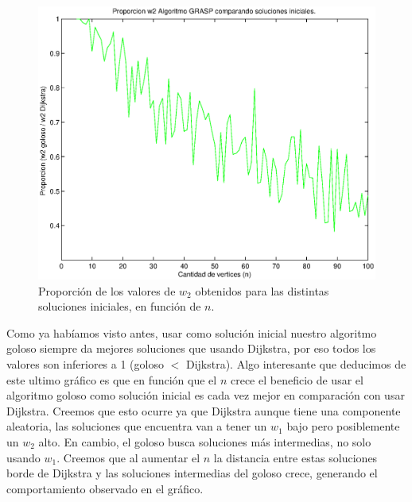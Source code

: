 \begin{figure}[H]
  \begin{center}
    \begin{minipage}{0.7\linewidth}
      \includegraphics[width=\linewidth]{graficos/grasp_comparacion_soluciones_iniciales_tiempo.eps}
      \caption{Proporción de los valores de $w_2$ obtenidos para las distintas soluciones iniciales, en función de $n$.}\label{fig:grasp-soluciones-iniciales-tiempo}
    \end{minipage}
  \end{center}
\end{figure}


Como ya habíamos visto antes, usar como solución inicial nuestro algoritmo goloso siempre da mejores soluciones que usando Dijkstra, por eso todos los valores son inferiores a 1 (goloso $<$ Dijkstra). Algo interesante que deducimos de este ultimo gráfico es que en función que el $n$ crece el beneficio de usar el algoritmo goloso como solución inicial es cada vez mejor en comparación con usar Dijkstra. Creemos que esto ocurre ya que Dijkstra aunque tiene una componente aleatoria, las soluciones que encuentra van a tener un $w_1$ bajo pero posiblemente un $w_2$ alto. En cambio, el goloso busca soluciones más intermedias, no solo usando $w_1$. Creemos que al aumentar el $n$ la distancia entre estas soluciones borde de Dijkstra y las soluciones intermedias del goloso crece, generando el comportamiento observado en el gráfico. 